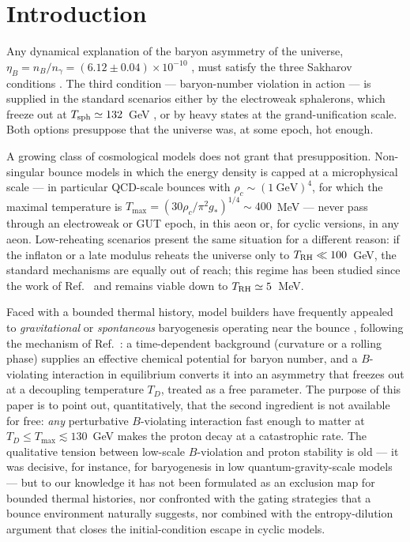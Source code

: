 \documentclass[12pt,a4paper]{article}
\begin{document}
\section{Introduction}

Any dynamical explanation of the baryon asymmetry of the universe,
$\eta_{B}=n_{B}/n_{\gamma}=(6.12\pm0.04)\times10^{-10}$
\cite{Planck2018}, must satisfy the three Sakharov conditions
\cite{Sakharov}.  The third condition --- baryon-number violation in
action --- is supplied in the standard scenarios either by the
electroweak sphalerons, which freeze out at
$T_{\rm sph}\simeq132$~GeV \cite{DOnofrio}, or by heavy states at the
grand-unification scale.  Both options presuppose that the universe was,
at some epoch, hot enough.

A growing class of cosmological models does not grant that
presupposition.  Non-singular bounce models in which the energy density
is capped at a microphysical scale --- in particular QCD-scale bounces
with $\rho_{c}\sim(1~\text{GeV})^{4}$, for which the maximal temperature
is $T_{\max}=(30\rho_{c}/\pi^{2}g_{*})^{1/4}\sim 400$~MeV --- never pass
through an electroweak or GUT epoch, in this aeon or, for cyclic
versions, in any aeon.  Low-reheating scenarios present the same
situation for a different reason: if the inflaton or a late modulus
reheats the universe only to $T_{\rm RH}\ll100$~GeV, the standard
mechanisms are equally out of reach; this regime has been studied since
the work of Ref.~\cite{DavidsonKolb} and remains viable down to
$T_{\rm RH}\simeq 5$~MeV.

Faced with a bounded thermal history, model builders have frequently
appealed to \emph{gravitational} or \emph{spontaneous} baryogenesis
operating near the bounce \cite{QuantumBounce,BigBounce}, following the
mechanism of Ref.~\cite{Davoudiasl}: a time-dependent background
(curvature or a rolling phase) supplies an effective chemical potential
for baryon number, and a $B$-violating interaction in equilibrium
converts it into an asymmetry that freezes out at a decoupling
temperature $T_{D}$, treated as a free parameter.  The purpose of this
paper is to point out, quantitatively, that the second ingredient is not
available for free: \emph{any} perturbative $B$-violating interaction
fast enough to matter at $T_{D}\le T_{\max}\lesssim130$~GeV makes the
proton decay at a catastrophic rate.  The qualitative tension between
low-scale $B$-violation and proton stability is old --- it was decisive,
for instance, for baryogenesis in low quantum-gravity-scale models
\cite{LowQG} --- but to our knowledge it has not been formulated as an
exclusion map for bounded thermal histories, nor confronted with the
gating strategies that a bounce environment naturally suggests, nor
combined with the entropy-dilution argument that closes the
initial-condition escape in cyclic models.
\end{document}
